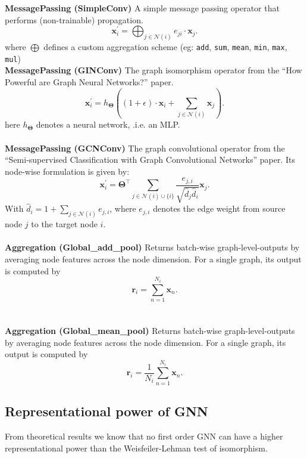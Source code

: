 \documentclass[twoside,11pt]{article}
\begin{document}
\noindent
{\bf MessagePassing (SimpleConv)}
{
        A simple message passing operator that performs (non-trainable) propagation.
        \[
            \mathbf{x}^{\prime}_i = \bigoplus_{j \in \mathcal{N}(i) } e_{ji} \cdot \mathbf{x}_j
        .\]
        where \( \bigoplus \) defines a custom aggregation scheme (eg: \texttt{add}, \texttt{sum}, \texttt{mean}, \texttt{min}, \texttt{max}, \texttt{mul})
}\\

\noindent
{\bf MessagePassing (GINConv)}
{
        The graph isomorphism operator from the “How Powerful are Graph Neural Networks?” paper.
        \[
            \mathbf{x}^{\prime}_i = h_{\mathbf{\Theta}} \left( (1 + \epsilon) \cdot \mathbf{x}_i + \sum_{j \in \mathcal{N}(i)} \mathbf{x}_j \right)
        .\]
        here \( h_{\mathbf{\Theta}} \) denotes a neural network, .i.e. an MLP.
}\\\\
{\bf MessagePassing (GCNConv)}
{
        The graph convolutional operator from the “Semi-supervised Classification with Graph Convolutional Networks” paper. Its node-wise formulation is given by:
        \[
            \mathbf{x}^{\prime}_i = \mathbf{\Theta}^{\top} \sum_{j \in \mathcal{N}(i) \cup \{ i \}} \frac{e_{j,i}}{\sqrt{\hat{d}_j \hat{d}_i}} \mathbf{x}_j
        .\]
        With \( \hat{d}_i = 1 + \sum_{j \in \mathcal{N}(i)} e_{j,i} \), where \( e_{j,i} \) denotes the edge weight from source node \( j \) to the target node \( i \).
}\\\\
{\bf Aggregation (Global\_add\_pool)}
{
        Returns batch-wise graph-level-outputs by averaging node features across the node dimension. For a single graph, its output is computed by
        \[
            \mathbf{r}_i = \sum_{n=1}^{N_i} \mathbf{x}_n
        .\]
}\\\\
{\bf Aggregation (Global\_mean\_pool)}
{
Returns batch-wise graph-level-outputs by averaging node features across the node dimension. For a single graph, its output is computed by
        \[
           \mathbf{r}_i = \frac{1}{N_i} \sum_{n=1}^{N_i} \mathbf{x}_n
        .\]
}


\subsection{Representational power of GNN} %
\label{sub:representational_power_of_gnn}
From theoretical results we know that no first order GNN can have a higher representational power than the Weisfeiler-Lehman test of isomorphism.
\end{document}
